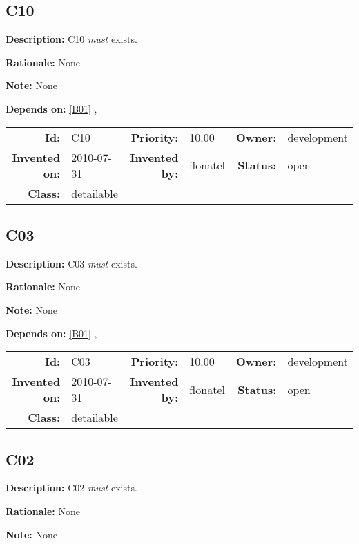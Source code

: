\subsection{C10}\label{C10}
\textbf{Description:} C10 \textsl{must} exists.

\textbf{Rationale:} None

\textbf{Note:} None

\textbf{Depends on:} \ref{B01} , 

\par
{\small \begin{center}\begin{tabular}{rlrlrl}
\textbf{Id:} & C10 & \textbf{Priority:} & 10.00 & \textbf{Owner:} & development \\ 
\textbf{Invented on:} & 2010-07-31 & \textbf{Invented by:} & flonatel & \textbf{Status:} & open \\ 
\textbf{Class:} & detailable & & & & \\ 
\end{tabular}\end{center} }%
\subsection{C03}\label{C03}
\textbf{Description:} C03 \textsl{must} exists.

\textbf{Rationale:} None

\textbf{Note:} None

\textbf{Depends on:} \ref{B01} , 

\par
{\small \begin{center}\begin{tabular}{rlrlrl}
\textbf{Id:} & C03 & \textbf{Priority:} & 10.00 & \textbf{Owner:} & development \\ 
\textbf{Invented on:} & 2010-07-31 & \textbf{Invented by:} & flonatel & \textbf{Status:} & open \\ 
\textbf{Class:} & detailable & & & & \\ 
\end{tabular}\end{center} }%
\subsection{C02}\label{C02}
\textbf{Description:} C02 \textsl{must} exists.

\textbf{Rationale:} None

\textbf{Note:} None

